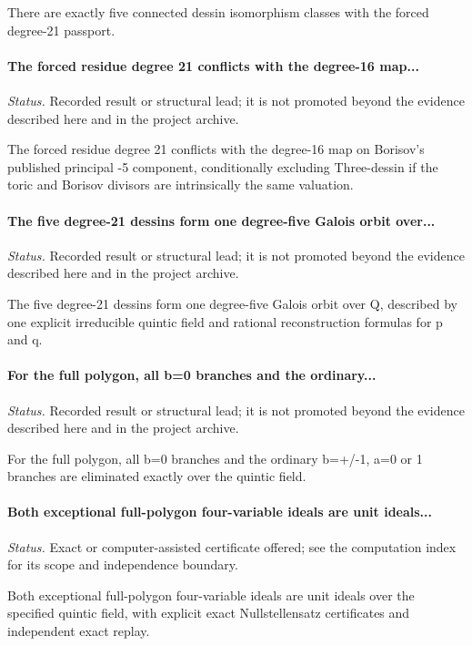 There are exactly five connected dessin isomorphism classes with the forced degree-21 passport.

\label{supp-note-06-011}
\paragraph{The forced residue degree 21 conflicts with the degree-16 map...}
\emph{Status.} Recorded result or structural lead; it is not promoted beyond the evidence described here and in the project archive.

The forced residue degree 21 conflicts with the degree-16 map on Borisov's published principal -5 component, conditionally excluding Three-dessin if the toric and Borisov divisors are intrinsically the same valuation.

\label{supp-note-06-012}
\paragraph{The five degree-21 dessins form one degree-five Galois orbit over...}
\emph{Status.} Recorded result or structural lead; it is not promoted beyond the evidence described here and in the project archive.

The five degree-21 dessins form one degree-five Galois orbit over Q, described by one explicit irreducible quintic field and rational reconstruction formulas for p and q.

\label{supp-note-06-013}
\paragraph{For the full polygon, all b=0 branches and the ordinary...}
\emph{Status.} Recorded result or structural lead; it is not promoted beyond the evidence described here and in the project archive.

For the full polygon, all b=0 branches and the ordinary b=+/-1, a=0 or 1 branches are eliminated exactly over the quintic field.

\label{supp-note-06-014}
\paragraph{Both exceptional full-polygon four-variable ideals are unit ideals...}
\emph{Status.} Exact or computer-assisted certificate offered; see the computation index for its scope and independence boundary.

Both exceptional full-polygon four-variable ideals are unit ideals over the specified quintic field, with explicit exact Nullstellensatz certificates and independent exact replay.

